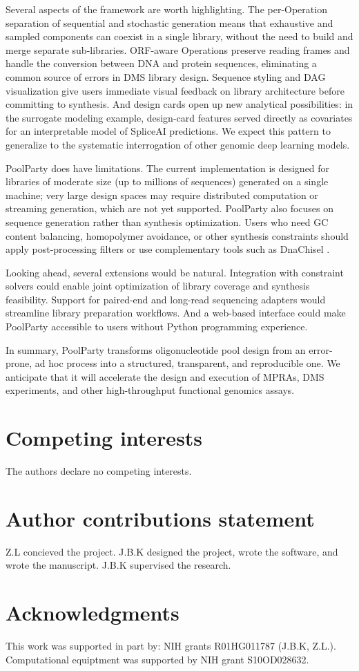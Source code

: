 \documentclass[unnumsec,webpdf,modern,large]{mam-authoring-template}%
\theoremstyle{thmstyleone}%
\theoremstyle{thmstyletwo}%
\theoremstyle{thmstylethree}%
\begin{document}
Several aspects of the framework are worth highlighting. The per-Operation separation of sequential and stochastic generation means that exhaustive and sampled components can coexist in a single library, without the need to build and merge separate sub-libraries. ORF-aware Operations preserve reading frames and handle the conversion between DNA and protein sequences, eliminating a common source of errors in DMS library design. Sequence styling and DAG visualization give users immediate visual feedback on library architecture before committing to synthesis. And design cards open up new analytical possibilities: in the surrogate modeling example, design-card features served directly as covariates for an interpretable model of SpliceAI predictions. We expect this pattern to generalize to the systematic interrogation of other genomic deep learning models.

PoolParty does have limitations. The current implementation is designed for libraries of moderate size (up to millions of sequences) generated on a single machine; very large design spaces may require distributed computation or streaming generation, which are not yet supported. PoolParty also focuses on sequence generation rather than synthesis optimization. Users who need GC content balancing, homopolymer avoidance, or other synthesis constraints should apply post-processing filters or use complementary tools such as DnaChisel \citep{Zulkower2020jk}.

Looking ahead, several extensions would be natural. Integration with constraint solvers could enable joint optimization of library coverage and synthesis feasibility. Support for paired-end and long-read sequencing adapters would streamline library preparation workflows. And a web-based interface could make PoolParty accessible to users without Python programming experience.

In summary, PoolParty transforms oligonucleotide pool design from an error-prone, ad hoc process into a structured, transparent, and reproducible one. We anticipate that it will accelerate the design and execution of MPRAs, DMS experiments, and other high-throughput functional genomics assays.

\section{Competing interests}
The authors declare no competing interests. 

\section{Author contributions statement}
Z.L concieved the project. J.B.K designed the project, wrote the software, and wrote the manuscript. J.B.K supervised the research. 

\section{Acknowledgments}
This work was supported in part by: NIH grants R01HG011787 (J.B.K, Z.L.). Computational equiptment was supported by NIH grant S10OD028632.


\end{document}
